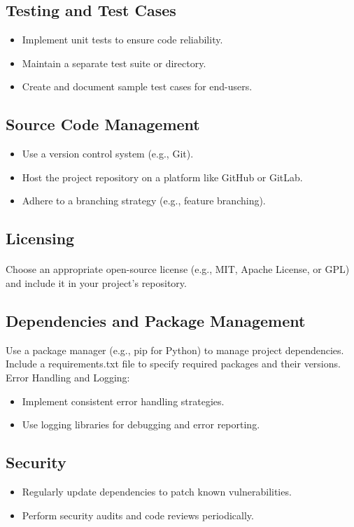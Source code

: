 \documentclass{article}
\begin{document}
\subsection{Testing and Test Cases}
\begin{itemize}
    \item Implement unit tests to ensure code reliability.
    \item Maintain a separate test suite or directory.
    \item Create and document sample test cases for end-users.
\end{itemize}

\subsection{Source Code Management}
\begin{itemize}
    \item Use a version control system (e.g., Git).
    \item Host the project repository on a platform like GitHub or GitLab.
    \item Adhere to a branching strategy (e.g., feature branching).
\end{itemize}

\subsection{Licensing}
\paragraph{}
Choose an appropriate open-source license (e.g., MIT, Apache License, or GPL) and
include it in your project's repository.

\subsection{Dependencies and Package Management}
Use a package manager (e.g., pip for Python) to manage project dependencies.
Include a requirements.txt file to specify required packages and their versions.
Error Handling and Logging:
\begin{itemize}
    \item Implement consistent error handling strategies.
    \item Use logging libraries for debugging and error reporting.
\end{itemize}

\subsection{Security}
\begin{itemize}
    \item Regularly update dependencies to patch known vulnerabilities.
    \item Perform security audits and code reviews periodically.
\end{itemize}
\end{document}
